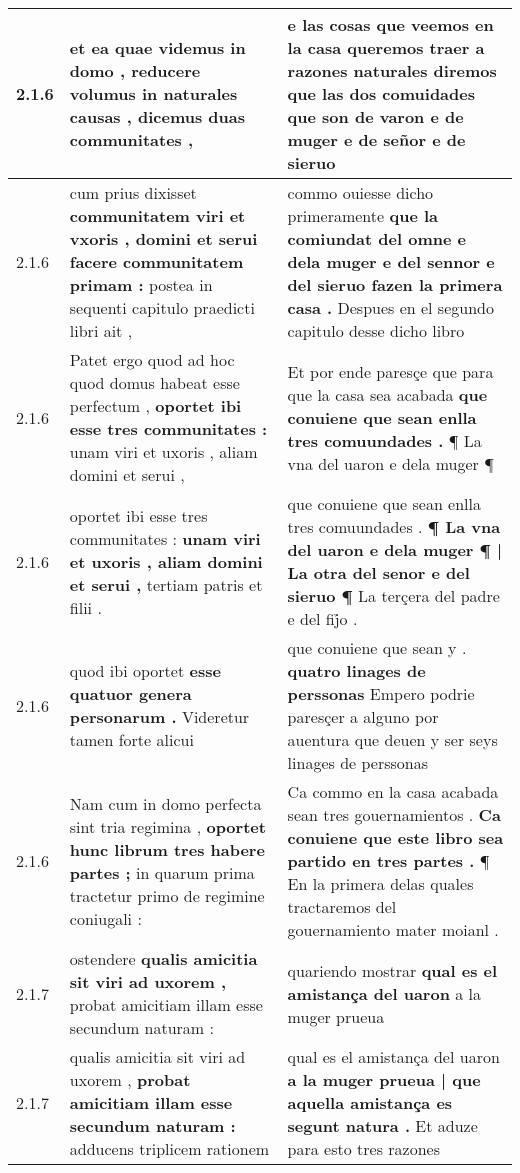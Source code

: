 \begin{tabular}{|p{1cm}|p{6.5cm}|p{6.5cm}|}
2.1.6 & et ea quae videmus in domo , \textbf{ reducere volumus in naturales causas , } dicemus duas communitates , & e las cosas que veemos en la casa queremos traer \textbf{ a razones naturales diremos que las dos comuidades } que son de varon e de muger e de señor e de sieruo \\\hline
2.1.6 & cum prius dixisset \textbf{ communitatem viri et vxoris , domini et serui facere communitatem primam : } postea in sequenti capitulo praedicti libri ait , & commo ouiesse dicho primeramente \textbf{ que la comiundat del omne e dela muger e del sennor e del sieruo fazen la primera casa . } Despues en el segundo capitulo desse dicho libro \\\hline
2.1.6 & Patet ergo quod ad hoc quod domus habeat esse perfectum , \textbf{ oportet ibi esse tres communitates : } unam viri et uxoris , aliam domini et serui , & Et por ende paresçe que para que la casa sea acabada \textbf{ que conuiene que sean enlla tres comuundades . } ¶ La vna del uaron e dela muger ¶ \\\hline
2.1.6 & oportet ibi esse tres communitates : \textbf{ unam viri et uxoris , aliam domini et serui , } tertiam patris et filii . & que conuiene que sean enlla tres comuundades . \textbf{ ¶ La vna del uaron e dela muger ¶ | La otra del senor e del sieruo ¶ } La terçera del padre e del fij̉o . \\\hline
2.1.6 & quod ibi oportet \textbf{ esse quatuor genera personarum . } Videretur tamen forte alicui & que conuiene que sean y . \textbf{ quatro linages de perssonas } Empero podrie paresçer a alguno por auentura que deuen y ser seys linages de perssonas \\\hline
2.1.6 & Nam cum in domo perfecta sint tria regimina , \textbf{ oportet hunc librum tres habere partes ; } in quarum prima tractetur primo de regimine coniugali : & Ca commo en la casa acabada sean tres gouernamientos . \textbf{ Ca conuiene que este libro sea partido en tres partes . } ¶ En la primera delas quales tractaremos del gouernamiento mater moianl . \\\hline
2.1.7 & ostendere \textbf{ qualis amicitia sit viri ad uxorem , } probat amicitiam illam esse secundum naturam : & quariendo mostrar \textbf{ qual es el amistança del uaron } a la muger prueua \\\hline
2.1.7 & qualis amicitia sit viri ad uxorem , \textbf{ probat amicitiam illam esse secundum naturam : } adducens triplicem rationem & qual es el amistança del uaron \textbf{ a la muger prueua | que aquella amistança es segunt natura . } Et aduze para esto tres razones \\\hline

\end{tabular}
